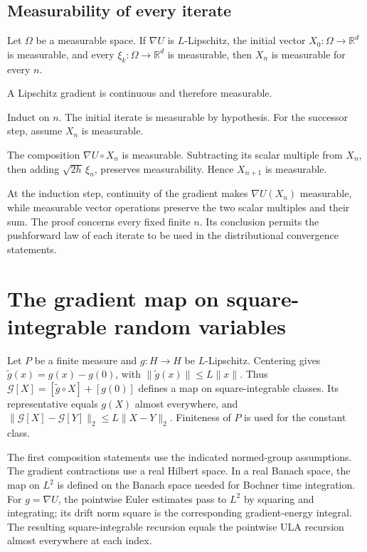 \documentclass[11pt,a4paper]{article}
\begin{document}
\subsection{\texorpdfstring{Measurability of every iterate}{Measurability of every iterate}}


Let \(\Omega\) be a measurable space. If \(\nabla U\) is \(L\)-Lipschitz, the initial vector \(X_0:\Omega\to\mathbb R^d\) is measurable, and every \(\xi_k:\Omega\to\mathbb R^d\) is measurable, then \(X_n\) is measurable for every \(n\).



A Lipschitz gradient is continuous and therefore measurable.



Induct on \(n\). The initial iterate is measurable by hypothesis. For the successor step, assume \(X_n\) is measurable.



The composition \(\nabla U\circ X_n\) is measurable. Subtracting its scalar multiple from \(X_n\), then adding \(\sqrt{2h}\,\xi_n\), preserves measurability. Hence \(X_{n+1}\) is measurable.



At the induction step, continuity of the gradient makes \(\nabla U(X_n)\) measurable, while measurable vector operations preserve the two scalar multiples and their sum. The proof concerns every fixed finite \(n\). Its conclusion permits the pushforward law of each iterate to be used in the distributional convergence statements.


\section{\texorpdfstring{The gradient map on square-integrable random variables}{The gradient map on square-integrable random variables}}


Let \(P\) be a finite measure and \(g:H\to H\) be \(L\)-Lipschitz. Centering gives \(\widetilde g(x)=g(x)-g(0)\), with \(\|\widetilde g(x)\|\le L\|x\|\). Thus \(\mathcal G[X]=[\widetilde g\circ X]+[g(0)]\) defines a map on square-integrable classes. Its representative equals \(g(X)\) almost everywhere, and \(\|\mathcal G[X]-\mathcal G[Y]\|_2\le L\|X-Y\|_2\). Finiteness of \(P\) is used for the constant class.



The first composition statements use the indicated normed-group assumptions. The gradient contractions use a real Hilbert space. In a real Banach space, the map on \(L^2\) is defined on the Banach space needed for Bochner time integration. For \(g=\nabla U\), the pointwise Euler estimates pass to \(L^2\) by squaring and integrating; its drift norm square is the corresponding gradient-energy integral. The resulting square-integrable recursion equals the pointwise ULA recursion almost everywhere at each index.
\end{document}
